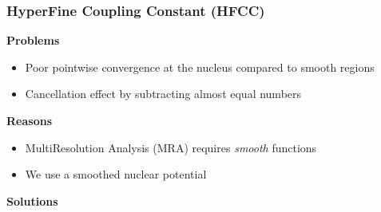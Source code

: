 \begin{frame}
\frametitle{HyperFine Coupling Constant (HFCC)}
\scriptsize

\textbf{Problems}
\begin{itemize}
\item Poor pointwise convergence at the nucleus compared to smooth regions
\item Cancellation effect by subtracting almost equal numbers
\end{itemize}

\pause
\vspace{5mm}

\textbf{Reasons}
\begin{itemize}
\item MultiResolution Analysis (MRA) requires \emph{smooth} functions
\item We use a smoothed nuclear potential
\end{itemize}

\pause
\vspace{5mm}

\textbf{Solutions}
\end{frame}

